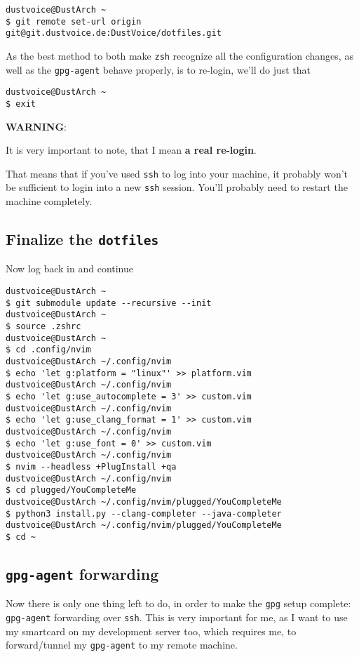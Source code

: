 \documentclass[9pt]{report}
\newcommand{\admonition}[2]{\textbf{#1}: {#2}}
\begin{document}
\begin{verbatim}
dustvoice@DustArch ~
$ git remote set-url origin git@git.dustvoice.de:DustVoice/dotfiles.git
\end{verbatim}

As the best method to both make \texttt{zsh} recognize all the configuration changes, as well as the \texttt{gpg-agent} behave properly, is to re-login, we’ll do just that


\begin{verbatim}
dustvoice@DustArch ~
$ exit
\end{verbatim}

\admonition{WARNING}{It is very important to note, that I mean \textbf{a real re-login}.


That means that if you’ve used \texttt{ssh} to log into your machine, it probably won’t be sufficient to login into a new \texttt{ssh} session.
You’ll probably need to restart the machine completely.

}

\vfill\eject

\hypertarget{x-finalize-the-dotfiles}{\subsection{Finalize the \texttt{dotfiles}}}
Now log back in and continue


\begin{verbatim}
dustvoice@DustArch ~
$ git submodule update --recursive --init
dustvoice@DustArch ~
$ source .zshrc
dustvoice@DustArch ~
$ cd .config/nvim
dustvoice@DustArch ~/.config/nvim
$ echo 'let g:platform = "linux"' >> platform.vim
dustvoice@DustArch ~/.config/nvim
$ echo 'let g:use_autocomplete = 3' >> custom.vim
dustvoice@DustArch ~/.config/nvim
$ echo 'let g:use_clang_format = 1' >> custom.vim
dustvoice@DustArch ~/.config/nvim
$ echo 'let g:use_font = 0' >> custom.vim
dustvoice@DustArch ~/.config/nvim
$ nvim --headless +PlugInstall +qa
dustvoice@DustArch ~/.config/nvim
$ cd plugged/YouCompleteMe
dustvoice@DustArch ~/.config/nvim/plugged/YouCompleteMe
$ python3 install.py --clang-completer --java-completer
dustvoice@DustArch ~/.config/nvim/plugged/YouCompleteMe
$ cd ~
\end{verbatim}


\vfill\eject

\hypertarget{x-gpg-agent-forwarding}{\subsection{\texttt{gpg-agent} forwarding}}
Now there is only one thing left to do, in order to make the \texttt{gpg} setup complete: \texttt{gpg-agent} forwarding over \texttt{ssh}.
This is very important for me, as I want to use my smartcard on my development server too, which requires me, to forward/tunnel my \texttt{gpg-agent} to my remote machine.
\end{document}
